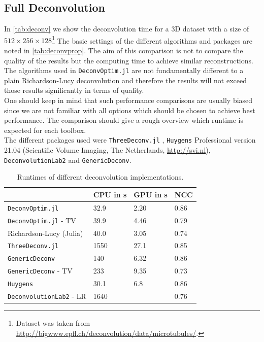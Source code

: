 \documentclass{juliacon}
\begin{document}
    \subsection{Full Deconvolution}
        In \autoref{tab:deconv} we show the deconvolution time for a 3D dataset with a size of $512 \times 256 \times 128$\footnote{Dataset was taken from \url{http://bigwww.epfl.ch/deconvolution/data/microtubules/}\cite{deconvlab2}.} 
        The basic settings of the different algorithms and packages are noted in \autoref{tab:deconvprop}.
        The aim of this comparison is not to compare the quality of the results but the computing time to achieve similar reconstructions. 
        The algorithms used in \verb|DeconvOptim.jl| are not fundamentally different to a plain Richardson-Lucy deconvolution and therefore the results will 
        not exceed those results significantly in terms of quality.\\
        One should keep in mind that such performance comparisons are usually biased since we are not
        familiar with all options which should be chosen to achieve best performance.
        The comparison should give a rough overview which runtime is expected for each toolbox.\\
        The different packages used were \verb|ThreeDeconv.jl| \cite{ikoma2018convex}, \verb|Huygens| Professional version 21.04 (Scientific Volume Imaging, The Netherlands, \url{http://svi.nl}), \verb|DeconvolutionLab2| \cite{deconvlab2} and \verb|GenericDeconv|.  

        \begin{table}[h]
            \begin{tabular}{l l l l }
                &  CPU in \si{\second}& GPU in \si{\second} & NCC\\ 
            \hline
            \verb|DeconvOptim.jl| & 32.9 & 2.20 & 0.86\\
            \verb|DeconvOptim.jl| - TV & 39.9 & 4.46 & 0.79\\
            Richardson-Lucy (Julia) & 40.0 & 3.05 & 0.74 \\
            \verb|ThreeDeconv.jl|& 1550 & 27.1 & 0.85\\
            \verb|GenericDeconv|  & 140 & 6.32 & 0.86\\
            \verb|GenericDeconv| - TV & 233 & 9.35 & 0.73\\
            \verb|Huygens| & 30.1 & 6.8 & 0.86\\
            \verb|DeconvolutionLab2| - LR& 1640 & & 0.76\\
            \end{tabular}
            \caption{Runtimes of different deconvolution implementations.}
            \label{tab:deconv}
        \end{table}
\end{document}
